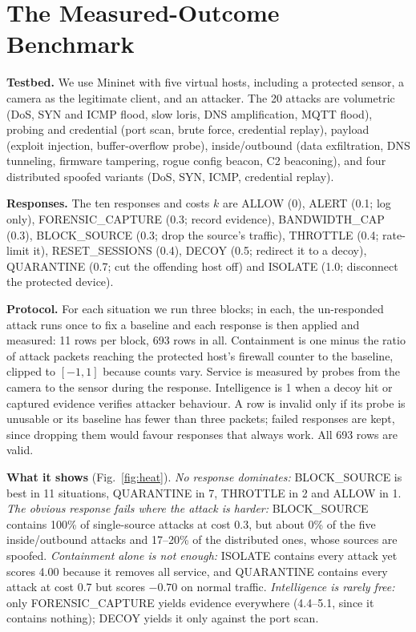 \documentclass[conference]{IEEEtran}
\begin{document}
\section{The Measured-Outcome Benchmark}
\label{sec:benchmark}
\textbf{Testbed.} We use Mininet \cite{lantz2010network} with five virtual hosts, including a protected sensor, a camera as the legitimate client, and an attacker. The 20 attacks are volumetric (DoS, SYN and ICMP flood, slow loris, DNS amplification, MQTT flood), probing and credential (port scan, brute force, credential replay), payload (exploit injection, buffer-overflow probe), inside/outbound (data exfiltration, DNS tunneling, firmware tampering, rogue config beacon, C2 beaconing), and four distributed spoofed variants (DoS, SYN, ICMP, credential replay).

\textbf{Responses.} The ten responses and costs $k$ are ALLOW (0), ALERT (0.1; log only), FORENSIC\_CAPTURE (0.3; record evidence), BANDWIDTH\_CAP (0.3), BLOCK\_SOURCE (0.3; drop the source's traffic), THROTTLE (0.4; rate-limit it), RESET\_SESSIONS (0.4), DECOY (0.5; redirect it to a decoy), QUARANTINE (0.7; cut the offending host off) and ISOLATE (1.0; disconnect the protected device).

\textbf{Protocol.} For each situation we run three blocks; in each, the un-responded attack runs once to fix a baseline and each response is then applied and measured: 11 rows per block, 693 rows in all. Containment is one minus the ratio of attack packets reaching the protected host's firewall counter to the baseline, clipped to $[-1,1]$ because counts vary. Service is measured by probes from the camera to the sensor during the response. Intelligence is 1 when a decoy hit or captured evidence verifies attacker behaviour. A row is invalid only if its probe is unusable or its baseline has fewer than three packets; failed responses are kept, since dropping them would favour responses that always work. All 693 rows are valid.

\textbf{What it shows} (Fig.~\ref{fig:heat}). \emph{No response dominates:} BLOCK\_SOURCE is best in 11 situations, QUARANTINE in 7, THROTTLE in 2 and ALLOW in 1. \emph{The obvious response fails where the attack is harder:} BLOCK\_SOURCE contains 100\% of single-source attacks at cost 0.3, but about 0\% of the five inside/outbound attacks and 17--20\% of the distributed ones, whose sources are spoofed. \emph{Containment alone is not enough:} ISOLATE contains every attack yet scores 4.00 because it removes all service, and QUARANTINE contains every attack at cost 0.7 but scores $-0.70$ on normal traffic. \emph{Intelligence is rarely free:} only FORENSIC\_CAPTURE yields evidence everywhere (4.4--5.1, since it contains nothing); DECOY yields it only against the port scan.
\end{document}
